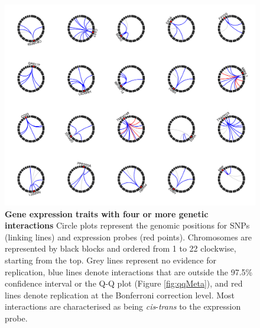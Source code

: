 \documentclass{article}
\begin{document}
\begin{figure}
	\centering
	\includegraphics[width=5in]{circles_replication2}
	\caption{\textbf{Gene expression traits with four or more genetic interactions} Circle plots represent the genomic positions for SNPs (linking lines) and expression probes (red points). Chromosomes are represented by black blocks and ordered from 1 to 22 clockwise, starting from the top. Grey lines represent no evidence for replication, blue lines denote interactions that are outside the 97.5\% confidence interval or the Q-Q plot (Figure \ref{fig:qqMeta}), and red lines denote replication at the Bonferroni correction level. Most interactions are characterised as being \emph{cis}-\emph{trans} to the expression probe.}
	\label{fig:circleplots}
\end{figure}
\clearpage
\end{document}
